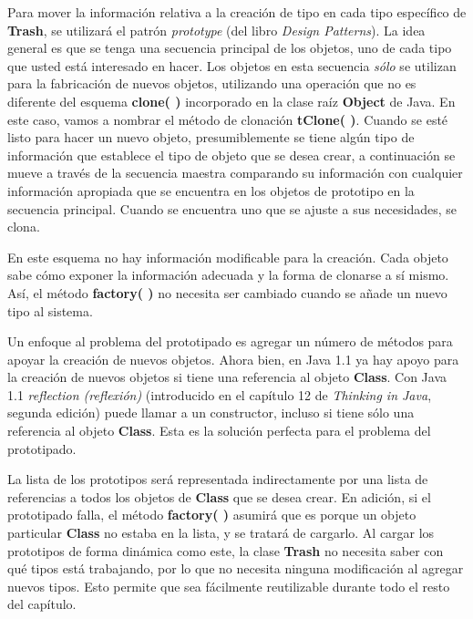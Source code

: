 Para mover la información relativa a la creación de tipo en cada tipo específico de \textbf{Trash}, se utilizará el patrón \textit{prototype} (del libro \textit{Design Patterns}). La idea general es que se tenga una secuencia principal de los objetos, uno de cada tipo que usted está interesado en hacer. Los objetos en esta secuencia \textit{sólo} se utilizan para la fabricación de nuevos objetos, utilizando una operación que no es diferente del esquema \textbf{clone( )} incorporado en la clase raíz \textbf{Object} de Java. En este caso, vamos a nombrar el método de clonación \textbf{tClone( )}. Cuando se esté listo para hacer un nuevo objeto, presumiblemente se tiene algún tipo de información que establece el tipo de objeto que se desea crear, a continuación se mueve a través de la secuencia maestra comparando su información con cualquier información apropiada que se encuentra en los objetos de prototipo en la secuencia principal. Cuando se encuentra uno que se ajuste a sus necesidades, se clona.    \newline

En este esquema no hay información modificable para la creación. Cada objeto sabe cómo exponer la información adecuada y la forma de clonarse a sí mismo. Así, el método \textbf{factory( )} no necesita ser cambiado cuando se añade un nuevo tipo al sistema.     \newline

Un enfoque al problema del prototipado es agregar un número de métodos para apoyar la creación de nuevos objetos. Ahora bien, en Java 1.1 ya hay apoyo para la creación de nuevos objetos si tiene una referencia al objeto \textbf{Class}. Con Java 1.1 \textit{reflection (reflexión)} (introducido en el capítulo 12 de \textit{Thinking in Java}, segunda edición) puede llamar a un constructor, incluso si tiene sólo una referencia al objeto \textbf{Class}. Esta es la solución perfecta para el problema del prototipado.   \newline

La lista de los prototipos será representada indirectamente por una lista de referencias a todos los objetos de \textbf{Class} que se desea crear. En adición, si el prototipado falla, el método \textbf{factory( )} asumirá que es porque un objeto particular \textbf{Class} no estaba en la lista, y se tratará de cargarlo. Al cargar los prototipos de forma dinámica como este, la clase \textbf{Trash} no necesita saber con qué tipos está trabajando, por lo que no necesita ninguna modificación al agregar nuevos tipos. Esto permite que sea fácilmente reutilizable durante todo el resto del capítulo.     \newline

